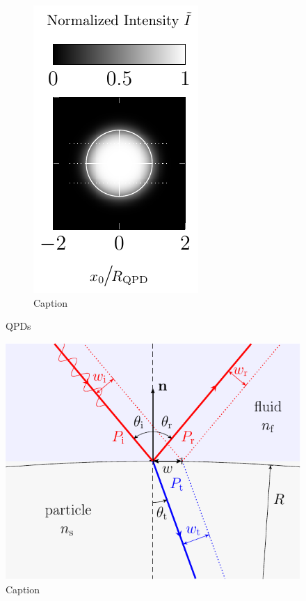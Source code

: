 \begin{figure}
\begin{subfigure}[b]{0.3\textwidth}
    \label{fig:T_yQPD}
  \end{subfigure}
  \hfill
  \begin{subfigure}[b]{0.3\textwidth}
    \centering
    \includegraphics[]{Plots/cache/QPDt.pdf}
    \caption{Caption}
    \label{fig:T_totalQPD}
  \end{subfigure}
  \caption{QPDs}
  \label{fig:QPDs}
\end{figure}

\lipsum[1-5]

\begin{figure}[htp]
  \centering
  \includegraphics[]{Plots/cache/Snell.pdf}
  \caption{Caption}
  \label{fig:T_snell}
\end{figure}


